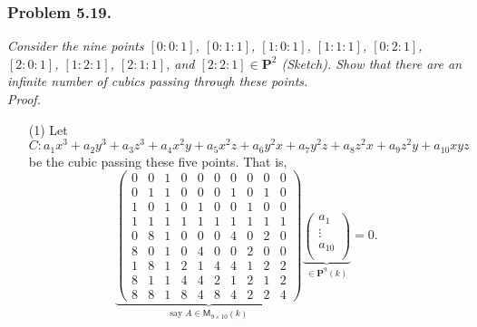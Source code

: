 \documentclass{article}
\begin{document}
\subsubsection*{Problem 5.19.}
\emph{Consider the nine points
$[0:0:1]$, $[0:1:1]$, $[1:0:1]$, $[1:1:1]$, $[0:2:1]$,
$[2:0:1]$, $[1:2:1]$, $[2:1:1]$, and $[2:2:1] \in \mathbf{P}^2$ (Sketch).
Show that there are an infinite number of cubics passing through these points.} \\



\emph{Proof.}
\begin{enumerate}
\item[(1)]
  Let $C: a_1 x^3 + a_2 y^3 + a_3 z^3
    + a_4 x^2y + a_5 x^2z + a_6 y^2 x + a_7 y^2 z + a_8 z^2 x + a_9 z^2 y + a_{10} xyz$
    be the cubic passing these five points.
  That is,
  \[
    \underbrace{\begin{pmatrix}
      0 & 0 & 1 & 0 & 0 & 0 & 0 & 0 & 0 & 0 \\
      0 & 1 & 1 & 0 & 0 & 0 & 1 & 0 & 1 & 0 \\
      1 & 0 & 1 & 0 & 1 & 0 & 0 & 1 & 0 & 0 \\
      1 & 1 & 1 & 1 & 1 & 1 & 1 & 1 & 1 & 1 \\
      0 & 8 & 1 & 0 & 0 & 0 & 4 & 0 & 2 & 0 \\
      8 & 0 & 1 & 0 & 4 & 0 & 0 & 2 & 0 & 0 \\
      1 & 8 & 1 & 2 & 1 & 4 & 4 & 1 & 2 & 2 \\
      8 & 1 & 1 & 4 & 4 & 2 & 1 & 2 & 1 & 2 \\
      8 & 8 & 1 & 8 & 4 & 8 & 4 & 2 & 2 & 4
    \end{pmatrix}}_{\text{say } A \in \mathsf{M}_{9 \times 10}(k)}
    \underbrace{\begin{pmatrix}
      a_1 \\
      \vdots \\
      a_{10} \\
    \end{pmatrix}}_{\in \mathbf{P}^9(k)}
    = 0.
  \]


\end{enumerate}
\end{document}
